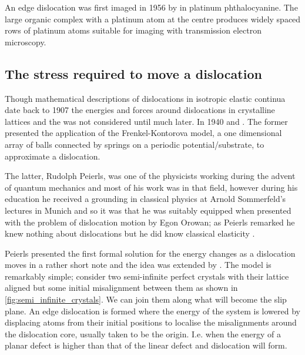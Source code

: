 An edge dislocation was first imaged in 1956 by \citet{Menter1956} in platinum phthalocyanine. The large organic complex with a platinum atom at the centre produces widely spaced rows of platinum atoms suitable for imaging with transmission electron microscopy.




\subsection{The stress required to move a dislocation}

Though mathematical descriptions of dislocations in isotropic elastic continua date back to 1907 \cite{Volterra1907} the energies and forces around dislocations in crystalline lattices and the  was not considered until much later. In 1940 \citet{Dehlinger1940} and \citet{Peierls1940}. The former presented the application of the Frenkel-Kontorova model, a one dimensional array of balls connected by springs on a periodic potential/substrate, to approximate a dislocation.

The latter, Rudolph Peierls, was one of the physicists working during the advent of quantum mechanics and most of his work was in that field, however during his education he received a grounding in classical physics at Arnold Sommerfeld's lectures in Munich and so it was that he was suitably equipped when presented with the problem of dislocation motion by Egon Orowan; as Peierls remarked he knew nothing about dislocations but he did know classical elasticity \cite{Edwards1996}.


Peierls presented the first formal solution for the energy changes as a dislocation moves in a rather short note \cite{Peierls1940} and the idea was extended by \citet{Nabarro1947}. The model is remarkably simple; consider two semi-infinite perfect crystals with their lattice aligned but some initial misalignment between them as shown in \autoref{fig:semi_infinite_crystals}. We can join them along what will become the slip plane. An edge dislocation is formed where the energy of the system is lowered by displacing atoms from their initial positions to localise the misalignments around the dislocation core, usually taken to be the origin. I.e. when the energy of a planar defect is higher than that of the linear defect and dislocation will form.



